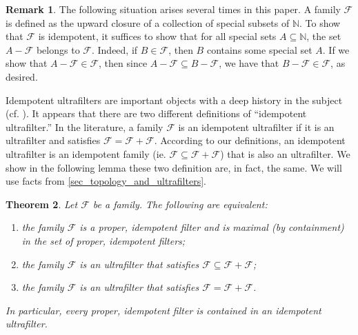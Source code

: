 \documentclass[letter,11pt]{article}
\theoremstyle{plain}
\newtheorem{theorem}{Theorem}
\theoremstyle{definition}
\newtheorem{remark}[theorem]{Remark}
\theoremstyle{plain}
\theoremstyle{plain}
\numberwithin{equation}{section}
\newcommand{\N}{\mathbb{N}}
\newcommand{\filter}{\mathscr{F}}
\newcommand{\family}{\mathscr{F}}
\begin{document}
\begin{remark}
    \label{rmk_showing_idempotency}
    The following situation arises several times in this paper.  A family $\family$ is defined as the upward closure of a collection of special subsets of $\N$.  To show that $\family$ is idempotent, it suffices to show that for all special sets $A \subseteq \N$, the set $A - \filter$ belongs to $\family$.  Indeed, if $B \in \filter$, then $B$ contains some special set $A$.  If we show that $A-\filter \in \filter$, then since $A- \filter \subseteq B - \filter$, we have that $B - \filter \in \filter$, as desired.
\end{remark}




Idempotent ultrafilters are important objects with a deep history in the subject (cf. \cite{bergelson_2010}).  It appears that there are two different definitions of ``idempotent ultrafilter.''  In the literature, a family $\family$ is an idempotent ultrafilter if it is an ultrafilter and satisfies $\family = \family + \family$.  According to our definitions, an idempotent ultrafilter is an idempotent family (ie. $\family \subseteq \family + \family$) that is also an ultrafilter. We show in the following lemma these two definition are, in fact, the same.  We will use facts from \cref{sec_topology_and_ultrafilters}.


\begin{theorem}
\label{thm_equiv_forms_of_max_idempot_filter}
    Let $\family$ be a family.  The following are equivalent:
    \begin{enumerate}
        \item
        \label{item_max_prop_idemp_filter}
        the family $\family$ is a proper, idempotent filter and is maximal (by containment) in the set of proper, idempotent filters;

        \item
        \label{item_ultra_idemp}
        the family $\family$ is an ultrafilter that satisfies $\family \subseteq \family + \family$;

        \item
        \label{item_ultra_strong_idemp}
        the family $\family$ is an ultrafilter that satisfies $\family = \family + \family$.
    \end{enumerate}
    In particular, every proper, idempotent filter is contained in an idempotent ultrafilter.
\end{theorem}
\end{document}
